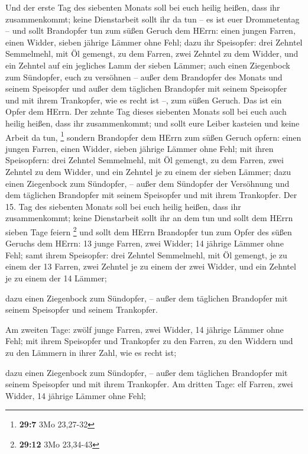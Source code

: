  Und der erste Tag des siebenten Monats soll bei euch
heilig heißen, dass ihr zusammenkommt; keine Dienstarbeit sollt ihr da
tun -- es ist euer Drommetentag --  und sollt Brandopfer
tun zum süßen Geruch dem HErrn: einen jungen Farren, einen Widder,
sieben jährige Lämmer ohne Fehl;  dazu ihr Speisopfer:
drei Zehntel Semmelmehl, mit Öl gemengt, zu dem Farren, zwei Zehntel zu
dem Widder,  und ein Zehntel auf ein jegliches Lamm der
sieben Lämmer;  auch einen Ziegenbock zum Sündopfer, euch
zu versöhnen --  außer dem Brandopfer des Monats und
seinem Speisopfer und außer dem täglichen Brandopfer mit seinem
Speisopfer und mit ihrem Trankopfer, wie es recht ist --, zum süßen
Geruch. Das ist ein Opfer dem HErrn.  Der zehnte Tag
dieses siebenten Monats soll bei euch auch heilig heißen, dass ihr
zusammenkommt; und sollt eure Leiber kasteien und keine Arbeit da tun,
\footnote{\textbf{29:7} 3Mo 23,27-32}  sondern Brandopfer
dem HErrn zum süßen Geruch opfern: einen jungen Farren, einen Widder,
sieben jährige Lämmer ohne Fehl;  mit ihren Speisopfern:
drei Zehntel Semmelmehl, mit Öl gemengt, zu dem Farren, zwei Zehntel zu
dem Widder,  und ein Zehntel je zu einem der sieben
Lämmer;  dazu einen Ziegenbock zum Sündopfer, -- außer
dem Sündopfer der Versöhnung und dem täglichen Brandopfer mit seinem
Speisopfer und mit ihrem Trankopfer.  Der 15. Tag des
siebenten Monats soll bei euch heilig heißen, dass ihr zusammenkommt;
keine Dienstarbeit sollt ihr an dem tun und sollt dem HErrn sieben Tage
feiern \footnote{\textbf{29:12} 3Mo 23,34-43}  und sollt
dem HErrn Brandopfer tun zum Opfer des süßen Geruchs dem HErrn: 13 junge
Farren, zwei Widder; 14 jährige Lämmer ohne Fehl;  samt
ihrem Speisopfer: drei Zehntel Semmelmehl, mit Öl gemengt, je zu einem
der 13 Farren, zwei Zehntel je zu einem der zwei Widder, 
und ein Zehntel je zu einem der 14 Lämmer;

 dazu einen Ziegenbock zum Sündopfer, -- außer dem
täglichen Brandopfer mit seinem Speisopfer und seinem Trankopfer.

 Am zweiten Tage: zwölf junge Farren, zwei Widder, 14
jährige Lämmer ohne Fehl;  mit ihrem Speisopfer und
Trankopfer zu den Farren, zu den Widdern und zu den Lämmern in ihrer
Zahl, wie es recht ist;

 dazu einen Ziegenbock zum Sündopfer, -- außer dem
täglichen Brandopfer mit seinem Speisopfer und mit ihrem Trankopfer.
 Am dritten Tage: elf Farren, zwei Widder, 14 jährige
Lämmer ohne Fehl;

